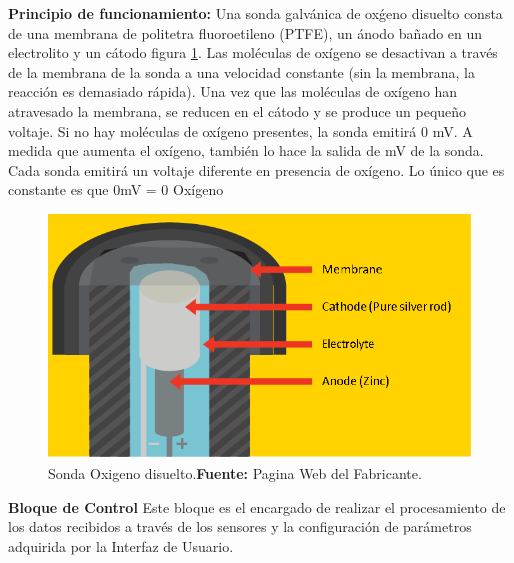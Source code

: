 \textbf{Principio de funcionamiento:} Una sonda galv\'anica de ox\'geno disuelto consta de una membrana de politetra fluoroetileno (PTFE), un \'anodo ba\~nado en un electrolito y un c\'atodo figura \ref{fig:DO_prove}.
Las mol\'eculas de ox\'igeno se desactivan a trav\'es de la membrana de la sonda a una velocidad constante (sin la membrana, la reacci\'on es demasiado r\'apida). Una vez que las mol\'eculas de ox\'igeno han atravesado la membrana, se reducen en el c\'atodo y se produce un peque\~no voltaje. Si no hay mol\'eculas de ox\'igeno presentes, la sonda emitir\'a 0 mV. A medida que aumenta el oxígeno, también lo hace la salida de mV de la sonda. Cada sonda emitirá un voltaje diferente en presencia de oxígeno. Lo único que es constante es que 0mV = 0 Oxígeno
\begin{figure}[H]
    \centering
    \includegraphics[scale=1.5]{Imagenes/cap3/DO.png}
    \caption[Sonda Oxigeno disuelto]{Sonda Oxigeno disuelto.\textbf{Fuente: }Pagina Web del Fabricante\cite{atlas_scientific_lab_nodate}.}
    \label{fig:DO_prove}
\end{figure}

\textbf{Bloque de Control}
Este bloque es el encargado de realizar el procesamiento de los datos recibidos a través de los sensores y la configuración de parámetros adquirida por la Interfaz de Usuario.


